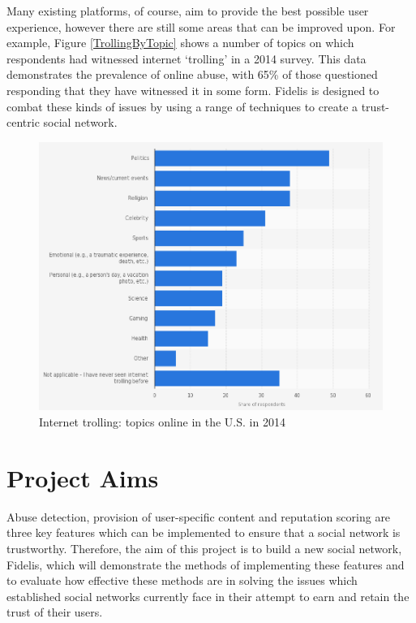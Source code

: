 Many existing platforms, of course, aim to provide the best possible user experience, however there are still some areas that can be improved upon. For example, Figure \ref{TrollingByTopic} shows a number of topics on which respondents had witnessed internet `trolling' in a 2014 survey. This data demonstrates the prevalence of online abuse, with 65\% of those questioned responding that they have witnessed it in some form. Fidelis is designed to combat these kinds of issues by using a range of techniques to create a trust-centric social network.

\begin{figure}[H]
  \centering
  \includegraphics[width=1.0\textwidth]{Images/Introduction/TrollingByTopic}
  \caption{Internet trolling: topics online in the U.S. in 2014 \cite{Statista:TrollingByTopic}} \label{fig:TrollingByTopic} 
\end{figure}

\section{Project Aims}
Abuse detection, provision of user-specific content and reputation scoring are three key features which can be implemented to ensure that a social network is trustworthy. Therefore, the aim of this project is to build a new social network, Fidelis, which will demonstrate the methods of implementing these features and to evaluate how effective these methods are in solving the issues which established social networks currently face in their attempt to earn and retain the trust of their users.


